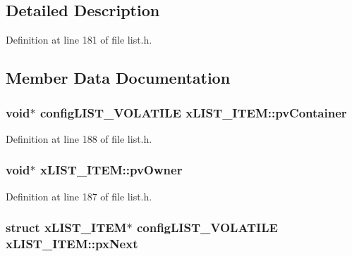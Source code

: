 \subsection{Detailed Description}


Definition at line 181 of file list.\+h.



\subsection{Member Data Documentation}
\subsubsection[{\texorpdfstring{pv\+Container}{pvContainer}}]{\setlength{\rightskip}{0pt plus 5cm}void$\ast$ {\bf config\+L\+I\+S\+T\+\_\+\+V\+O\+L\+A\+T\+I\+LE} x\+L\+I\+S\+T\+\_\+\+I\+T\+E\+M\+::pv\+Container}\hypertarget{structx_l_i_s_t___i_t_e_m_a341462d06236aa07eaf1a864e4b59951}{}\label{structx_l_i_s_t___i_t_e_m_a341462d06236aa07eaf1a864e4b59951}


Definition at line 188 of file list.\+h.

\subsubsection[{\texorpdfstring{pv\+Owner}{pvOwner}}]{\setlength{\rightskip}{0pt plus 5cm}void$\ast$ x\+L\+I\+S\+T\+\_\+\+I\+T\+E\+M\+::pv\+Owner}\hypertarget{structx_l_i_s_t___i_t_e_m_aeb3110b50fe0dbce826d929b27b5ddb1}{}\label{structx_l_i_s_t___i_t_e_m_aeb3110b50fe0dbce826d929b27b5ddb1}


Definition at line 187 of file list.\+h.

\subsubsection[{\texorpdfstring{px\+Next}{pxNext}}]{\setlength{\rightskip}{0pt plus 5cm}struct {\bf x\+L\+I\+S\+T\+\_\+\+I\+T\+EM}$\ast$ {\bf config\+L\+I\+S\+T\+\_\+\+V\+O\+L\+A\+T\+I\+LE} x\+L\+I\+S\+T\+\_\+\+I\+T\+E\+M\+::px\+Next}\hypertarget{structx_l_i_s_t___i_t_e_m_a03713c4ee953ef5ca6adbec883720c60}{}\label{structx_l_i_s_t___i_t_e_m_a03713c4ee953ef5ca6adbec883720c60}


